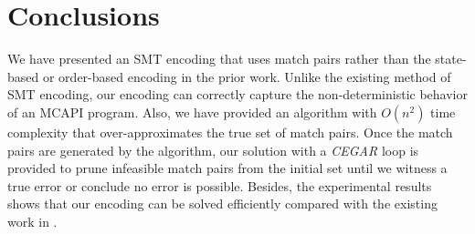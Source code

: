 \section{Conclusions}
We have presented an SMT encoding that uses match pairs rather than the state-based or order-based encoding in the prior work. Unlike the existing method of SMT encoding, our encoding can correctly capture the non-deterministic behavior of an MCAPI program. Also, we have provided an algorithm with $O(n^2)$ time complexity that over-approximates the true set of match pairs. Once the match pairs are generated by the algorithm, our solution with a \textit{CEGAR} loop is provided to prune infeasible match pairs from the initial set until we witness a true error or conclude no error is possible. Besides, the experimental results shows that our encoding can be solved efficiently compared with the existing work in \cite{elwakil:padtad10}.

 